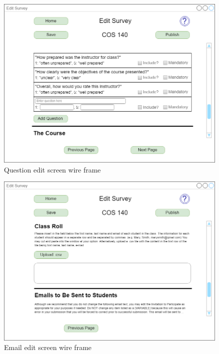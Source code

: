 \documentclass{article}
\begin{document}
\begin{center}
\begin{figure}
    \centering
    \includegraphics[scale=.3]{images/question_edit_screen.png}
    \caption{Question edit screen wire frame}
    \label{fig:my_label}
\end{figure}
\end{center}

\begin{center}
\begin{figure}
    \centering
    \includegraphics[scale=.3]{images/email_edit_screen.png}
    \caption{Email edit screen wire frame}
    \label{fig:my_label}
\end{figure}
\end{center}
\end{document}
